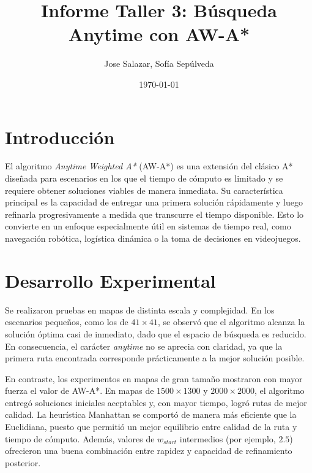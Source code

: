 \documentclass[12pt,a4paper]{article}
\title{Informe Taller 3: Búsqueda Anytime con AW-A*}
\author{Jose Salazar, Sofía Sepúlveda}
\date{\today}
\begin{document}
\maketitle

\section{Introducción}
El algoritmo \textit{Anytime Weighted A*} (AW-A*) es una extensión del clásico A* diseñada para escenarios en los que el tiempo de cómputo es limitado y se requiere obtener soluciones viables de manera inmediata. Su característica principal es la capacidad de entregar una primera solución rápidamente y luego refinarla progresivamente a medida que transcurre el tiempo disponible. Esto lo convierte en un enfoque especialmente útil en sistemas de tiempo real, como navegación robótica, logística dinámica o la toma de decisiones en videojuegos.

\section{Desarrollo Experimental}
Se realizaron pruebas en mapas de distinta escala y complejidad. En los escenarios pequeños, como los de $41 \times 41$, se observó que el algoritmo alcanza la solución óptima casi de inmediato, dado que el espacio de búsqueda es reducido. En consecuencia, el carácter \textit{anytime} no se aprecia con claridad, ya que la primera ruta encontrada corresponde prácticamente a la mejor solución posible.

En contraste, los experimentos en mapas de gran tamaño mostraron con mayor fuerza el valor de AW-A*. En mapas de $1500 \times 1300$ y $2000 \times 2000$, el algoritmo entregó soluciones iniciales aceptables y, con mayor tiempo, logró rutas de mejor calidad. La heurística Manhattan se comportó de manera más eficiente que la Euclidiana, puesto que permitió un mejor equilibrio entre calidad de la ruta y tiempo de cómputo. Además, valores de $w_{start}$ intermedios (por ejemplo, $2.5$) ofrecieron una buena combinación entre rapidez y capacidad de refinamiento posterior.
\end{document}
